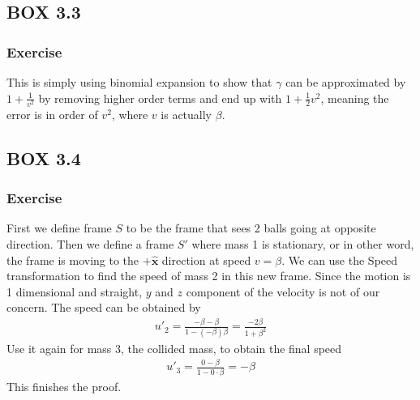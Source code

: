 \documentclass[12pt]{book}
\newcommand{\paren}[1]{\left( #1 \right)}
\newcommand{\unx}{\hat{\mathbf{x}}}
\begin{document}
        \subsection{BOX 3.3}
        \subsubsection{Exercise}
        This is simply using binomial expansion to show that $\gamma$ can be approximated by $1+\frac{1}{v^2}$ by removing higher order terms and end up with $1+\frac{1}{2}v^2$, meaning the error is in order of $v^2$, where $v$ is actually $\beta$.

        \subsection{BOX 3.4}
        \subsubsection{Exercise}
        First we define frame $S$ to be the frame that sees 2 balls going at opposite direction. Then we define a frame $S'$ where mass 1 is stationary, or in other word, the frame is moving to the $+\unx$ direction at speed $v=\beta$. We can use the Speed transformation to find the speed of mass 2 in this new frame. 
        Since the motion is 1 dimensional and straight, $y$ and $z$ component of the velocity is not of our concern. The speed can be obtained by
        \begin{align}
        u'_2 = \frac{-\beta - \beta}{1-\paren{-\beta}\beta} = \frac{-2\beta}{1+\beta^2}
        \end{align}
        Use it again for mass 3, the collided mass, to obtain the final speed
        \begin{align}
        u'_3 = \frac{0-\beta}{1-0\cdot\beta} = -\beta
        \end{align}
        This finishes the proof. 
        
\end{document}
